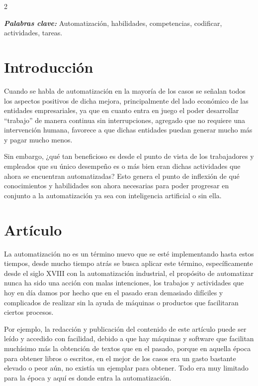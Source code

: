 \documentclass[12pt,spanish,Letterpaper,openany]{book}
\begin{document}
\begin {multicols}{2}

\textbf{\emph{Palabras clave:}} Automatización, habilidades, competencias, codificar, actividades, tareas.

\hypertarget{introducciuxf3n-10}{%
\section{Introducción}\label{introducciuxf3n-10}}

Cuando se habla de automatización en la mayoría de los casos se señalan todos los aspectos
positivos de dicha mejora, principalmente del lado económico de las entidades empresariales, ya
que en cuanto entra en juego el poder desarrollar ``trabajo'' de manera continua sin interrupciones,
agregado que no requiere una intervención humana, favorece a que dichas entidades puedan
generar mucho más y pagar mucho menos.

Sin embargo, ¿qué tan beneficioso es desde el punto de vista de los trabajadores y empleados que
su único desempeño es o más bien eran dichas actividades que ahora se encuentran automatizadas?
Esto genera el punto de inflexión de qué conocimientos y habilidades son ahora necesarias para
poder progresar en conjunto a la automatización ya sea con inteligencia artificial o sin ella.

\hypertarget{artuxedculo-10}{%
\section{Artículo}\label{artuxedculo-10}}

La automatización no es un término nuevo que se esté implementando hasta estos tiempos, desde
mucho tiempo atrás se busca aplicar este término, específicamente desde el siglo XVIII con la
automatización industrial, el propósito de automatizar nunca ha sido una acción con malas
intenciones, los trabajos y actividades que hoy en día damos por hecho que en el pasado eran
demasiado difíciles y complicados de realizar sin la ayuda de máquinas o productos que facilitaran
ciertos procesos.

Por ejemplo, la redacción y publicación del contenido de este artículo puede ser leído y accedido
con facilidad, debido a que hay máquinas y software que facilitan muchísimo más la obtención de
textos que en el pasado, porque en aquella época para obtener libros o escritos, en el mejor de los casos era un gasto bastante elevado o peor aún, no existía un ejemplar para obtener. Todo era muy
limitado para la época y aquí es donde entra la automatización.


\end{multicols}
\end{document}
